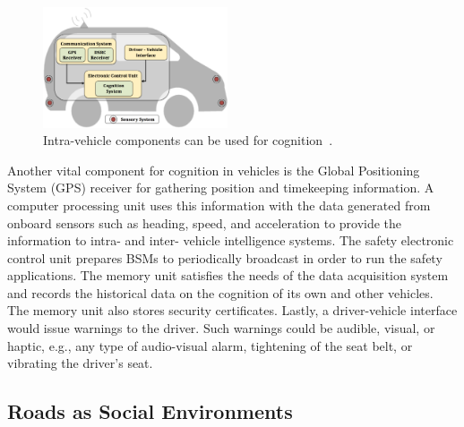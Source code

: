 \documentclass[journal, 11pt]{IEEEtran}
\begin{document}
\begin{figure}[t!]
  \centering
  \includegraphics[width=0.485\textwidth]{figs/car.pdf}
  \caption{Intra-vehicle components can be used for
  cognition~\cite{hardingNHTSA14}.}
  \label{fig:invehComp}
\end{figure}

Another vital component for cognition in vehicles is the Global Positioning
System (GPS) receiver for gathering position and timekeeping information. A
computer processing unit uses this information with the data generated from
onboard sensors such as heading, speed, and acceleration to provide the
information to intra- and inter- vehicle intelligence systems. The safety
electronic control unit prepares BSMs to periodically broadcast in order to run
the safety applications. The memory unit satisfies the needs of the data
acquisition system and records the historical data on the cognition of its
own and other vehicles. The memory unit also stores security certificates.
Lastly, a driver-vehicle interface would issue warnings to the driver. Such
warnings could be audible, visual, or haptic, e.g., any type of audio-visual
alarm, tightening of the seat belt, or vibrating the driver's seat.

\subsection{Roads as Social Environments}
\end{document}
